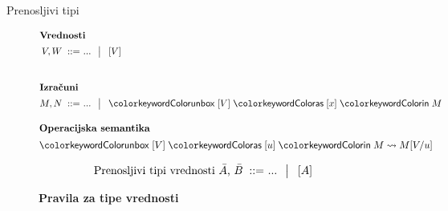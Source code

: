 \documentclass{beamer}
\theoremstyle{definition} %
\theoremstyle{plain} %
\begin{document}
	\begin{frame}{Prenosljivi tipi}

		\begin{figure}[hp]
			\parbox{\textwidth}{
				\centering
				\tiny
				\begin{align*}
				\shortintertext{\textbf{Vrednosti}}
				V, W
				\bnfis & ... \,\bnfor\! \tmboxed{V}     
				\\[5ex]
				\shortintertext{\textbf{Izračuni}}
				M, N
				\bnfis & ... \,\bnfor\! \tmunbox{V}{x}{M}
				\end{align*}
			} 
		\end{figure}
		
		\begin{figure}[tp]
			\centering
			\tiny
			\begin{align*}
			\shortintertext{\textbf{Operacijska semantika}}
			\tmunbox{V}{u}{M} & \reduces M[V/u]
			\end{align*}
		\end{figure}
	
		\begin{figure}[tb]
			\parbox{\textwidth}{
				\centering
				\tiny
				\begin{align*}
				\text{Prenosljivi tipi vrednosti $\bar{A}$, $\bar{B}$}
				\mathrel{\;{:}{:}{=}\ } & ... \,\mathrel{\;\big|\ \ }\! [A]
				\end{align*}
			} 
		\end{figure}
	
		
		\begin{figure}[tp]
			\centering
			\tiny
			\textbf{Pravila za tipe vrednosti}
			\begin{mathpar}
			\end{mathpar}
		\end{figure}
		
	\end{frame}
\end{document}
